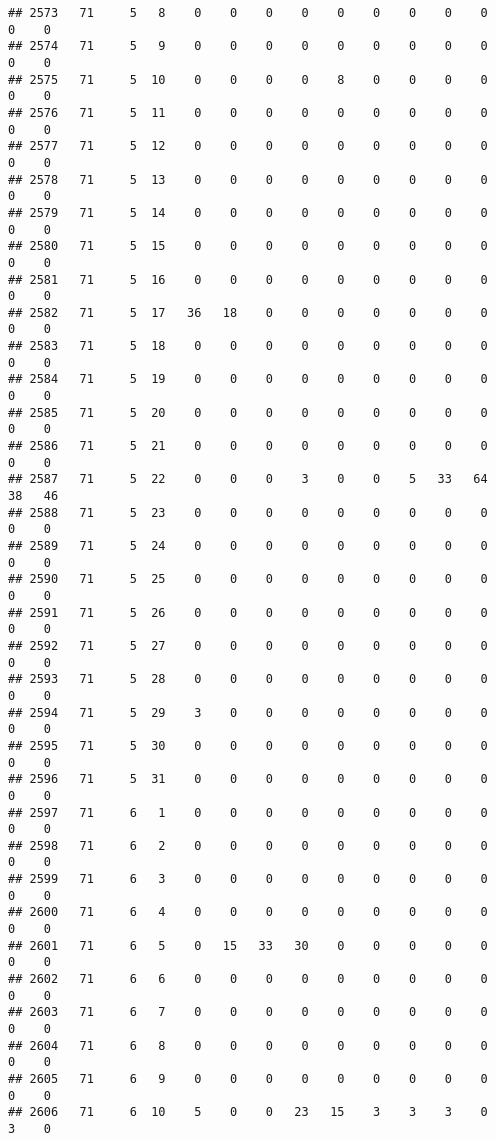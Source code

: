 \documentclass[]{article}
\begin{document}
\begin{verbatim}
## 2573   71     5   8    0    0    0    0    0    0    0    0    0    0    0
## 2574   71     5   9    0    0    0    0    0    0    0    0    0    0    0
## 2575   71     5  10    0    0    0    0    8    0    0    0    0    0    0
## 2576   71     5  11    0    0    0    0    0    0    0    0    0    0    0
## 2577   71     5  12    0    0    0    0    0    0    0    0    0    0    0
## 2578   71     5  13    0    0    0    0    0    0    0    0    0    0    0
## 2579   71     5  14    0    0    0    0    0    0    0    0    0    0    0
## 2580   71     5  15    0    0    0    0    0    0    0    0    0    0    0
## 2581   71     5  16    0    0    0    0    0    0    0    0    0    0    0
## 2582   71     5  17   36   18    0    0    0    0    0    0    0    0    0
## 2583   71     5  18    0    0    0    0    0    0    0    0    0    0    0
## 2584   71     5  19    0    0    0    0    0    0    0    0    0    0    0
## 2585   71     5  20    0    0    0    0    0    0    0    0    0    0    0
## 2586   71     5  21    0    0    0    0    0    0    0    0    0    0    0
## 2587   71     5  22    0    0    0    3    0    0    5   33   64   38   46
## 2588   71     5  23    0    0    0    0    0    0    0    0    0    0    0
## 2589   71     5  24    0    0    0    0    0    0    0    0    0    0    0
## 2590   71     5  25    0    0    0    0    0    0    0    0    0    0    0
## 2591   71     5  26    0    0    0    0    0    0    0    0    0    0    0
## 2592   71     5  27    0    0    0    0    0    0    0    0    0    0    0
## 2593   71     5  28    0    0    0    0    0    0    0    0    0    0    0
## 2594   71     5  29    3    0    0    0    0    0    0    0    0    0    0
## 2595   71     5  30    0    0    0    0    0    0    0    0    0    0    0
## 2596   71     5  31    0    0    0    0    0    0    0    0    0    0    0
## 2597   71     6   1    0    0    0    0    0    0    0    0    0    0    0
## 2598   71     6   2    0    0    0    0    0    0    0    0    0    0    0
## 2599   71     6   3    0    0    0    0    0    0    0    0    0    0    0
## 2600   71     6   4    0    0    0    0    0    0    0    0    0    0    0
## 2601   71     6   5    0   15   33   30    0    0    0    0    0    0    0
## 2602   71     6   6    0    0    0    0    0    0    0    0    0    0    0
## 2603   71     6   7    0    0    0    0    0    0    0    0    0    0    0
## 2604   71     6   8    0    0    0    0    0    0    0    0    0    0    0
## 2605   71     6   9    0    0    0    0    0    0    0    0    0    0    0
## 2606   71     6  10    5    0    0   23   15    3    3    3    0    3    0

\end{verbatim}
\end{document}
